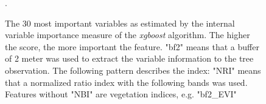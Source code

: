 \documentclass[review]{elsarticle}
\begin{document}
\begin{figure} [b!]
	\begin{center}
		\caption{The 30 most important variables as estimated by the internal variable importance measure of the \textit{xgboost} algorithm. The higher the score, the more important the feature.
			"bf2" means that a buffer of 2 meter was used to extract the variable information to the tree observation. The following pattern describes the index: "NRI" means that a normalized ratio index with the following bands was used. Features without "NBI" are vegetation indices, e.g. "bf2\_EVI"}. %
		\label{fig:var-imp}
	\end{center}
\end{figure}
\end{document}
